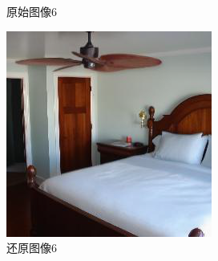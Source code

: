 \begin{figure}[H]
\begin{minipage}[b]{0.3\linewidth}
    \caption{原始图像6}
    \label{original image }
  \end{minipage}
\hspace{0.1cm}
  \begin{minipage}[b]{0.3\linewidth}
    \includegraphics[width=\linewidth]{Picture/recon/00008.png}
    \caption{还原图像6}
    \label{inpainted image}
  \end{minipage}
  \label{整块损坏图像}
\end{figure}